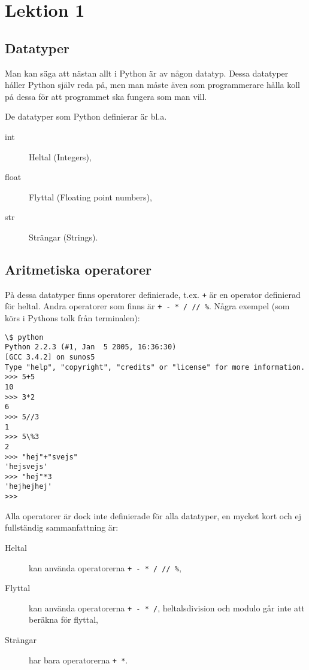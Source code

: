 \chapter{Lektion 1}

\section{Datatyper}

Man kan säga att nästan allt i Python är av någon datatyp. Dessa datatyper
håller Python själv reda på, men man måste även som programmerare hålla koll
på dessa för att programmet ska fungera som man vill.

De datatyper som Python definierar är bl.a.
\begin{description}
	\item[int] Heltal (Integers),
	\item[float] Flyttal (Floating point numbers),
	\item[str] Strängar (Strings).
\end{description}



\section{Aritmetiska operatorer}

På dessa datatyper finns operatorer definierade, t.ex. \verb'+' är en operator
definierad för heltal. Andra operatorer som finns är \verb'+ - * / // %'. Några
exempel (som körs i Pythons tolk från terminalen):
\begin{lstlisting}[style=text]
\$ python
Python 2.2.3 (#1, Jan  5 2005, 16:36:30)
[GCC 3.4.2] on sunos5
Type "help", "copyright", "credits" or "license" for more information.
>>> 5+5
10
>>> 3*2
6
>>> 5//3
1
>>> 5\%3
2
>>> "hej"+"svejs"
'hejsvejs'
>>> "hej"*3
'hejhejhej'
>>>
\end{lstlisting}

Alla operatorer är dock inte definierade för alla datatyper, en mycket kort
och ej fullständig sammanfattning är:
\begin{description}
	\item[Heltal] kan använda operatorerna \verb'+ - * / // %',
	\item[Flyttal] kan använda operatorerna \verb'+ - * /', heltalsdivision
	och modulo går inte att beräkna för flyttal,
	\item[Strängar] har bara operatorerna \verb'+ *'.
\end{description}



